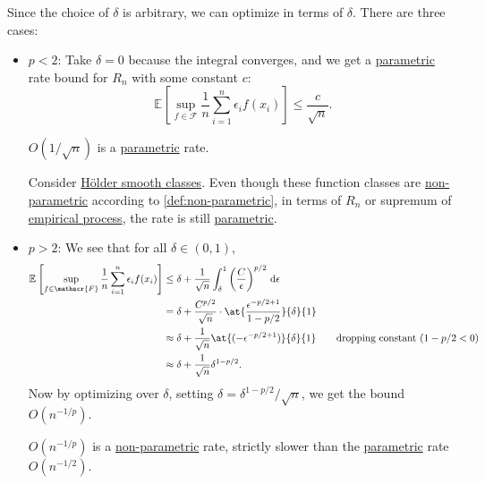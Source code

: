 Since the choice of \(\delta \) is arbitrary, we can optimize in terms of \(\delta \). There are three cases:
\begin{itemize}
	\item \(p < 2\): Take \(\delta = 0\) because the integral converges, and we get a \hyperref[def:parametric]{parametric} rate bound for \(R_n\) with some constant \(c\):
	      \[
		      \mathbb{E}_{}\left[\sup _{f\in \mathscr{F} } \frac{1}{n}\sum_{i=1}^{n} \epsilon _i f(x_i) \right] \leq \frac{c}{\sqrt{n} }.
	      \]
	      \begin{remark}
		      \(O(1 / \sqrt{n} )\) is a \hyperref[def:parametric]{parametric} rate.
	      \end{remark}
	      \begin{eg}
		      Consider \hyperref[def:Holder-smooth-function-class]{Hölder smooth classes}. Even though these function classes are \hyperref[def:non-parametric]{non-parametric} according to \autoref{def:non-parametric}, in terms of \(R_n\) or supremum of \hyperref[def:EP]{empirical process}, the rate is still \hyperref[def:parametric]{parametric}.
	      \end{eg}
	\item \(p > 2\): We see that for all \(\delta \in (0, 1)\),
	      \begin{align*}
		      \mathbb{E}_{}\left[\sup _{f\in \mathscr{F} } \frac{1}{n}\sum_{i=1}^{n} \epsilon _i f(x_i) \right]
		       & \leq \delta + \frac{1}{\sqrt{n} } \int_{\delta }^{1} \left( \frac{C}{\epsilon } \right) ^{p / 2} \,\mathrm{d}\epsilon        \\
		       & = \delta + \frac{C^{p / 2}}{\sqrt{n} } \cdot \at{ \frac{\epsilon ^{-p / 2 + 1}}{1 - p / 2}}{\delta }{1}                      \\
		       & \approx \delta + \frac{1}{\sqrt{n} } \at{(-\epsilon ^{-p / 2 + 1})}{\delta }{1} \tag*{dropping constant (\(1 - p / 2 < 0\))} \\
		       & \approx \delta + \frac{1}{\sqrt{n} } \delta ^{1 - p / 2}.
	      \end{align*}
	      Now by optimizing over \(\delta \), setting \(\delta = \delta ^{1 - p / 2} / \sqrt{n} \), we get the bound \(O(n^{-1 / p})\).
	      \begin{remark}
		      \(O(n^{-1 / p})\) is a \hyperref[def:non-parametric]{non-parametric} rate, strictly slower than the \hyperref[def:parametric]{parametric} rate \(O(n^{-1 / 2})\).
	      \end{remark}


\end{itemize}
